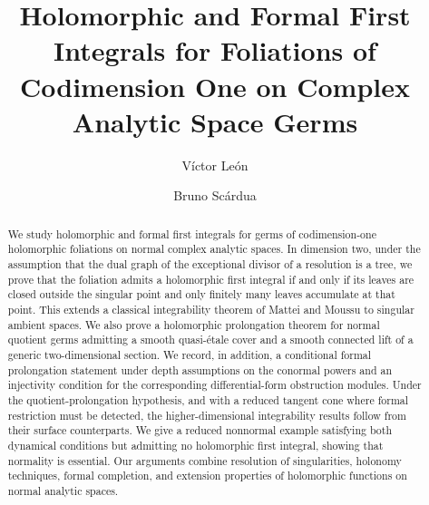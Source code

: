 \documentclass[11pt,twoside]{amsart}
\theoremstyle{definition}
\begin{document}
\pagestyle{fancy}



\title{Holomorphic and Formal First Integrals
for Foliations of Codimension One on
Complex Analytic Space Germs}



\author{V\'ictor Le\'on}
\address{V\'ictor Le\'on\\
ILACVN - CICN, Universidade Federal da Integra\c c\~ao Latino-Americana,\\
ITAIPU PARQUETEC, Foz de Igua\c cu-PR, 85867-900 - Brazil
}

\author{Bruno Sc\'ardua}
\address{Bruno Sc\'ardua\\ Instituto de Matem\'atica - Universidade Federal do Rio de Janeiro,\\
CP 68530, Rio de Janeiro-RJ, 21945-970 - Brazil}













\begin{abstract}
\sloppy

We study holomorphic and formal first integrals for germs of codimension-one holomorphic foliations on normal complex analytic spaces. In dimension two, under the assumption that the dual graph of the exceptional divisor of a resolution is a tree, we prove that the foliation admits a holomorphic first integral if and only if its leaves are closed outside the singular point and only finitely many leaves accumulate at that point. This extends a classical integrability theorem of Mattei and Moussu to singular ambient spaces. We also prove a holomorphic prolongation theorem for normal quotient germs admitting a smooth quasi-\'etale cover and a smooth connected lift of a generic two-dimensional section. We record, in addition, a conditional formal prolongation statement under depth assumptions on the conormal powers and an injectivity condition for the corresponding differential-form obstruction modules. Under the quotient-prolongation hypothesis, and with a reduced tangent cone where formal restriction must be detected, the higher-dimensional integrability results follow from their surface counterparts. We give a reduced nonnormal example satisfying both dynamical conditions but admitting no holomorphic first integral, showing that normality is essential. Our arguments combine resolution of singularities, holonomy techniques, formal completion, and extension properties of holomorphic functions on normal analytic spaces.


\end{abstract}
\end{document}
